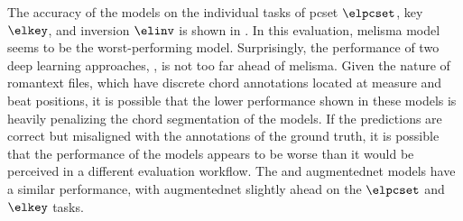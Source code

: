 

The accuracy of the models on the individual tasks of
\gls{pcset} $\elpcset$, key $\elkey$, and inversion $\elinv$
is shown in . In this evaluation,
\gls{melisma} model seems to be the worst-performing model.
Surprisingly, the performance of two deep learning
approaches, \textcite{mcleod2021modular,chen2021attend}, is
not too far ahead of \gls{melisma}. Given the nature of
\gls{romantext} files, which have discrete chord annotations
located at measure and beat positions, it is possible that
the lower performance shown in these models is heavily
penalizing the chord segmentation of the models. If the
predictions are correct but misaligned with the annotations
of the ground truth, it is possible that the performance of
the models appears to be worse than it would be perceived in
a different evaluation workflow. The
\textcite{micchi2021deep} and \gls{augmentednet} models have
a similar performance, with \gls{augmentednet} slightly
ahead on the $\elpcset$ and $\elkey$ tasks.

